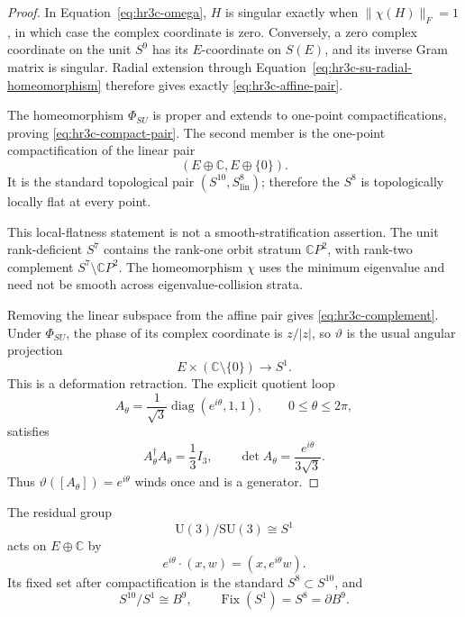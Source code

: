 \begin{proof}
In Equation~\eqref{eq:hr3c-omega}, \(H\) is singular exactly when
\(\lVert\chi(H)\rVert_F=1\), in which case the complex coordinate is zero.
Conversely, a zero complex coordinate on the unit \(S^9\) has its
\(E\)-coordinate on \(S(E)\), and its inverse Gram matrix is singular.
Radial extension through Equation~\eqref{eq:hr3c-su-radial-homeomorphism}
therefore gives exactly \eqref{eq:hr3c-affine-pair}.

The homeomorphism \(\Phi_{SU}\) is proper and extends to one-point
compactifications, proving \eqref{eq:hr3c-compact-pair}.  The second member
is the one-point compactification of the linear pair
\[
 (E\oplus\mathbb C,E\oplus\{0\}).
\]
It is the standard topological pair \((S^{10},S^8_{\mathrm{lin}})\);
therefore the \(S^8\) is topologically locally flat at every point.

This local-flatness statement is not a smooth-stratification assertion.
The unit rank-deficient \(S^7\) contains the rank-one orbit stratum
\(\mathbb CP^2\), with rank-two complement
\(S^7\setminus\mathbb CP^2\).  The homeomorphism \(\chi\) uses the minimum
eigenvalue and need not be smooth across eigenvalue-collision strata.

Removing the linear subspace from the affine pair gives
\eqref{eq:hr3c-complement}.  Under \(\Phi_{SU}\), the phase of its complex
coordinate is \(z/|z|\), so \(\vartheta\) is the usual angular projection
\[
 E\times(\mathbb C\setminus\{0\})\longrightarrow S^1.
\]
This is a deformation retraction.  The explicit quotient loop
\begin{equation}
 A_\theta=
 \frac1{\sqrt3}\operatorname{diag}(e^{i\theta},1,1),
 \qquad
 0\leq\theta\leq2\pi,
 \label{eq:hr3c-generator-loop}
\end{equation}
satisfies
\[
 A_\theta^\dagger A_\theta=\frac13I_3,
 \qquad
 \det A_\theta=\frac{e^{i\theta}}{3\sqrt3}.
\]
Thus \(\vartheta([A_\theta])=e^{i\theta}\) winds once and is a generator.
\end{proof}

\begin{corollary}
\label{cor:hr3c-residual-circle}
The residual group
\[
 \mathrm U(3)/\mathrm{SU}(3)\cong S^1
\]
acts on \(E\oplus\mathbb C\) by
\begin{equation}
 e^{i\theta}\cdot(x,w)=(x,e^{i\theta}w).
 \label{eq:hr3c-residual-action}
\end{equation}
Its fixed set after compactification is the standard
\(S^8\subset S^{10}\), and
\begin{equation}
 S^{10}/S^1\cong B^9,
 \qquad
 \operatorname{Fix}(S^1)=S^8=\partial B^9.
 \label{eq:hr3c-residual-quotient}
\end{equation}
\end{corollary}

